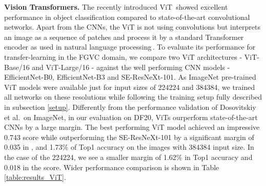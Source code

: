 \documentclass[10pt,twocolumn,letterpaper]{article}
\begin{document}
\textbf{Vision Transformers.}
The recently introduced ViT\,\cite{vit} showed excellent performance in object classification compared to state-of-the-art convolutional networks. Apart from the CNNs, the ViT is not using convolutions but interprets an image as a sequence of patches and process it by a standard Transformer encoder as used in  natural language processing\,\cite{vaswani2017attention}.
To evaluate its performance for transfer-learning in the FGVC domain, we compare two ViT architectures - ViT-Base/16 and ViT-Large/16 - against the well performing CNN models - EfficientNet-B0, EfficientNet-B3 and SE-ResNeXt-101. As ImageNet pre-trained ViT models were available just for input sizes of 224224 and 384384, we trained all networks on these resolutions while following the training setup fully described in subsection \ref{setup}. Differently from the performance validation of Dosovitskiy et al.\,\cite{vit} on ImageNet, in our evaluation on DF20, ViTs ourperform state-of-the-art CNNs by a large margin. The best performing ViT model achieved an impressive 0.743  score while outperforming the SE-ResNeXt-101 by a significant margin of 0.035 in , and 1.73\% of Top1 accuracy on the images with 384384 input size. In the case of the  224224, we see a smaller margin of 1.62\% in Top1 accuracy and 0.018 in the   score. Wider performance comparison is shown in Table\,\ref{table:results_ViT}.
\end{document}
